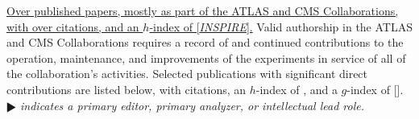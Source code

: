 
  \item  \href{https://inspirehep.net/authors/1071846}{Over  published papers, mostly as part of the ATLAS and CMS Collaborations, with over  citations, and an $h$-index of  [\textit{INSPIRE}].} Valid authorship in the ATLAS and CMS Collaborations requires a record of and continued contributions to the operation, maintenance, and improvements of the experiments in service of all of the collaboration's activities. Selected publications with significant direct contributions are listed below, with \inspirecollectioncitations{} citations, an $h$-index of \inspirecollectionhindex{}, and a $g$-index of \inspirecollectiongindex{} []. \textit{{$\RHD$} indicates a primary editor, primary analyzer, or intellectual lead role.}

